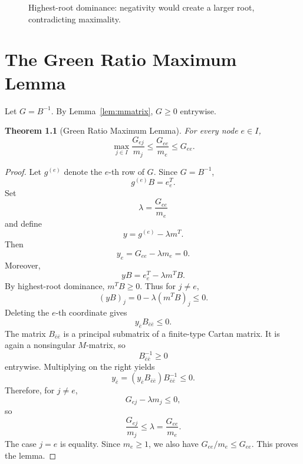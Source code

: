 \documentclass[11pt]{book}
\newtheorem{theorem}{Theorem}[chapter]
\theoremstyle{definition}
\begin{document}
\begin{figure}[h]
\centering
{}
\caption{Highest-root dominance: negativity would create a larger root, contradicting maximality.}
\end{figure}

\chapter{The Green Ratio Maximum Lemma}
Let $G=B^{-1}$. By Lemma~\ref{lem:mmatrix}, $G\ge0$ entrywise.

\begin{theorem}[Green Ratio Maximum Lemma]\label{thm:greenratio}
For every node $e\in I$,
\[
 \boxed{\max_{j\in I}\frac{G_{ej}}{m_j}\le \frac{G_{ee}}{m_e}\le G_{ee}.}
\]
\end{theorem}
\begin{proof}
Let $g^{(e)}$ denote the $e$-th row of $G$. Since $G=B^{-1}$,
\[
 g^{(e)}B=e_e^T.
\]
Set
\[
 \lambda=\frac{G_{ee}}{m_e}
\]
and define
\[
 y=g^{(e)}-\lambda m^T.
\]
Then
\[
 y_e=G_{ee}-\lambda m_e=0.
\]
Moreover,
\[
 yB=e_e^T-\lambda m^TB.
\]
By highest-root dominance, $m^T B\ge0$. Thus for $j\ne e$,
\[
 (yB)_j=0-\lambda(m^TB)_j\le0.
\]
Deleting the $e$-th coordinate gives
\[
 y_{\bar e}B_{\bar e\bar e}\le0.
\]
The matrix $B_{\bar e\bar e}$ is a principal submatrix of a finite-type Cartan matrix. It is again a nonsingular $M$-matrix, so
\[
 B_{\bar e\bar e}^{-1}\ge0
\]
entrywise. Multiplying on the right yields
\[
 y_{\bar e}=(y_{\bar e}B_{\bar e\bar e})B_{\bar e\bar e}^{-1}\le0.
\]
Therefore, for $j\ne e$,
\[
 G_{ej}-\lambda m_j\le0,
\]
so
\[
 \frac{G_{ej}}{m_j}\le\lambda=\frac{G_{ee}}{m_e}.
\]
The case $j=e$ is equality. Since $m_e\ge1$, we also have $G_{ee}/m_e\le G_{ee}$. This proves the lemma.
\end{proof}
\end{document}
